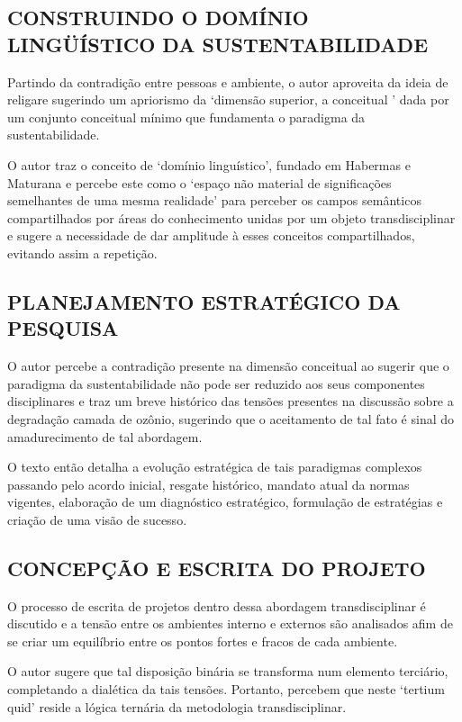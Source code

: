 \documentclass[
   article,       %
   12pt,          %
   oneside,       %
   a4paper,       %
   english,       %
   brazil,           %
   sumario=tradicional
   ]{abntex2}
\begin{document}
\subsection{CONSTRUINDO O DOMÍNIO LINGÜÍSTICO DA SUSTENTABILIDADE}

Partindo da contradição entre pessoas e ambiente, o autor aproveita da ideia de religare sugerindo um apriorismo da ‘dimensão superior, a conceitual \cite[p. 88]{Paradigma_Transdisciplinar_Metodologica}’ dada por um conjunto conceitual mínimo que fundamenta o paradigma da sustentabilidade.

O autor traz o conceito de ‘domínio linguístico’, fundado em Habermas e Maturana e percebe este como o ‘espaço não material de significações semelhantes de uma mesma realidade’ \cite[p. 86]{Paradigma_Transdisciplinar_Metodologica} para perceber os campos semânticos compartilhados por áreas do conhecimento unidas por um objeto transdisciplinar e sugere a necessidade de dar amplitude à esses conceitos compartilhados, evitando assim a repetição.



\subsection{PLANEJAMENTO ESTRATÉGICO DA PESQUISA}


O autor percebe a contradição presente na dimensão conceitual  ao sugerir que o paradigma da sustentabilidade não pode ser reduzido aos seus componentes disciplinares e traz um breve histórico das tensões presentes na discussão sobre a degradação camada de ozônio, sugerindo que o aceitamento de tal fato é sinal do amadurecimento de tal abordagem.

O texto então detalha a evolução estratégica de tais paradigmas complexos passando pelo acordo inicial, resgate histórico, mandato atual da normas vigentes, elaboração de um diagnóstico estratégico, formulação de estratégias e criação de uma visão de sucesso.


\subsection{CONCEPÇÃO E ESCRITA DO PROJETO}


O processo de escrita de projetos dentro dessa abordagem transdisciplinar é discutido e a tensão entre os ambientes interno e externos são analisados afim de se criar um equilíbrio entre os pontos fortes e fracos de cada ambiente. 

O autor sugere que tal disposição binária se transforma num elemento terciário, completando a dialética da tais tensões. Portanto, percebem que neste ‘tertium quid’ reside a lógica ternária da metodologia transdisciplinar.
\end{document}
